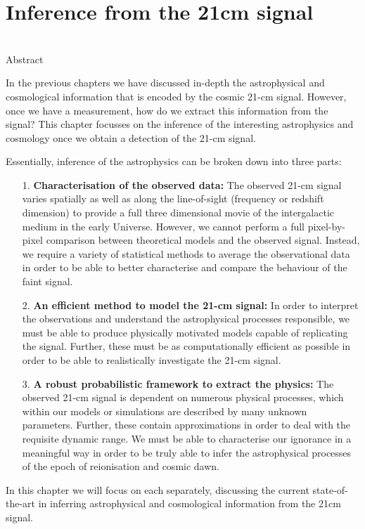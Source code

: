 \chapter{Inference from the 21cm signal}

\begin{bf}
  \author{Bradley Greig}\\
  
Abstract\\
\end{bf}

In the previous chapters we have discussed in-depth the astrophysical and cosmological information that is encoded by the cosmic 21-cm signal. However, once we have a measurement, how do we extract this information from the signal? This chapter focusses on the inference of the interesting astrophysics and cosmology once we obtain a detection of the 21-cm signal. 

Essentially, inference of the astrophysics can be broken down into three parts:
\begin{itemize}
\item[1.] \textbf{Characterisation of the observed data:} The observed 21-cm signal varies spatially as well as along the line-of-sight (frequency or redshift dimension) to provide a full three dimensional movie of the intergalactic medium in the early Universe. However, we cannot perform a full pixel-by-pixel comparison between theoretical models and the observed signal. Instead, we require a variety of statistical methods to average the observational data in order to be able to better characterise and compare the behaviour of the faint signal. 
\item[2.] \textbf{An efficient method to model the 21-cm signal:} In order to interpret the observations and understand the astrophysical processes responsible, we must be able to produce physically motivated models capable of replicating the signal. Further, these must be as computationally efficient as possible in order to be able to realistically investigate the 21-cm signal.
\item[3.] \textbf{A robust probabilistic framework to extract the physics:} The observed 21-cm signal is dependent on numerous physical processes, which within our models or simulations are described by many unknown parameters. Further, these contain approximations in order to deal with the requisite dynamic range. We must be able to characterise our ignorance in a meaningful way in order to be truly able to infer the astrophysical processes of the epoch of reionisation and cosmic dawn.
\end{itemize}
\noindent
In this chapter we will focus on each separately, discussing the current state-of-the-art in inferring astrophysical and cosmological information from the 21cm signal.

